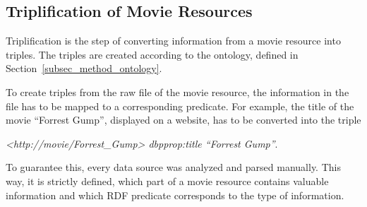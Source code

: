 \subsection{Triplification of Movie Resources}
\label{subsec_method_triplification}

Triplification is the step of converting information from a movie resource into triples.
The triples are created according to the ontology, defined in Section~\ref{subsec_method_ontology}.

To create triples from the raw file of the movie resource, the information in the file has to be mapped to a corresponding predicate.
For example, the title of the movie ``Forrest Gump'', displayed on a website, has to be converted into the triple
\begin{center}\emph{<http://movie/Forrest\_Gump> dbpprop:title ``Forrest Gump''}.\end{center}
To guarantee this, every data source was analyzed and parsed manually.
This way, it is strictly defined, which part of a movie resource contains valuable information and which RDF predicate corresponds to the type of information.